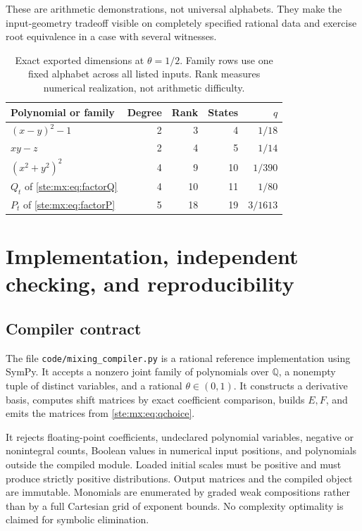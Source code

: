 \documentclass[11pt,letterpaper]{article}
\theoremstyle{definition}
\theoremstyle{remark}
\newcommand{\Q}{\mathbb Q}
\begin{document}
These are arithmetic demonstrations, not universal alphabets. They make the
input-geometry tradeoff visible on completely specified rational data and
exercise root equivalence in a case with several witnesses.

\begin{table}[ht]
\centering
\small
\begin{tabular}{@{}lrrrr@{}}
\toprule
Polynomial or family & Degree & Rank & States & $q$\\
\midrule
$(x-y)^2-1$ &2&3&4&$1/18$\\
$xy-z$ &2&4&5&$1/14$\\
$(x^2+y^2)^2$ &4&9&10&$1/390$\\
$Q_t$ of \eqref{ste:mx:eq:factorQ} &4&10&11&$1/80$\\
$P_t$ of \eqref{ste:mx:eq:factorP} &5&18&19&$3/1613$\\
\bottomrule
\end{tabular}
\caption{Exact exported dimensions at $\theta=1/2$. Family rows use one fixed
alphabet across all listed inputs. Rank measures numerical realization, not
arithmetic difficulty.}\label{ste:mx:tab:examples}
\end{table}

\section{Implementation, independent checking, and reproducibility}\label{ste:mx:sec:implementation}

\subsection{Compiler contract}

The file \texttt{code/mixing\_compiler.py} is a rational reference implementation
using SymPy. It accepts a nonzero joint family of polynomials over $\Q$, a
nonempty tuple of distinct variables, and a rational $\theta\in(0,1)$. It
constructs a derivative basis, computes shift matrices by exact coefficient
comparison, builds $E,F$, and emits the matrices from \eqref{ste:mx:eq:qchoice}.

It rejects floating-point coefficients, undeclared polynomial variables,
negative or nonintegral counts, Boolean values in numerical input positions,
and polynomials outside the compiled module. Loaded initial scales must be
positive and must produce strictly positive distributions. Output matrices
and the compiled object are immutable. Monomials are enumerated by graded
weak compositions rather than by a full Cartesian grid of exponent bounds.
No complexity optimality is claimed for symbolic elimination.
\end{document}
